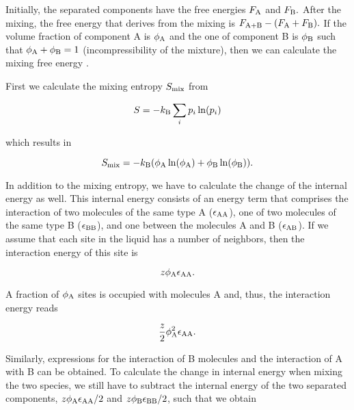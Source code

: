 \documentclass[letterpaper,10pt,english]{sphinxmanual}
\begin{document}
\sphinxAtStartPar
Initially, the separated components have the free energies \(F_{\rm A}\) and \(F_{\rm B}.\) After the mixing, the free energy that derives from the mixing is \(F_{\rm A+B}-(F_{\rm A}+F_{\rm B}).\) If the volume fraction of component A is \(\phi_{\rm A}\) and the one of component B is \(\phi_{\rm B}\) such that \(\phi_{\rm A}+\phi_{\rm B}=1\) (incompressibility of the mixture), then we can calculate the mixing free energy .

\sphinxAtStartPar
First we calculate the mixing entropy \(S_{\rm mix}\) from

\sphinxAtStartPar
\begin{equation}
S=-k_{\rm B}\sum_{i}p_{i}\ln(p_{i})
\end{equation}

\sphinxAtStartPar
which results in

\sphinxAtStartPar
\begin{equation}
S_{\rm mix}=-k_{\rm B}(\phi_{\rm A}\ln(\phi_{\rm A})+\phi_{\rm B}\ln(\phi_{\rm B})).
\end{equation}

\sphinxAtStartPar
In addition to the mixing entropy, we have to calculate the change of the internal energy as well. This internal energy consists of an energy term that comprises the interaction of two molecules of the same type A (\(\epsilon_{\rm AA}\)), one of two molecules of the same type B (\(\epsilon_{\rm BB}\)), and one between the molecules A and B (\(\epsilon_{\rm AB}\)). If we assume that each site in the liquid has a number of neighbors, then the interaction energy of this site is

\sphinxAtStartPar
\begin{equation}
z\phi_{\rm A}\epsilon_{\rm AA}.
\end{equation}

\sphinxAtStartPar
A fraction of \(\phi_{\rm A}\) sites is occupied with molecules A and, thus, the interaction energy reads

\sphinxAtStartPar
\begin{equation}
\frac{z}{2}\phi_{\rm A}^2\epsilon_{\rm AA}.
\end{equation}

\sphinxAtStartPar
Similarly, expressions for the interaction of B molecules and the interaction of A with B can be obtained. To calculate the change in internal energy when mixing the two species, we still have to subtract the internal energy of the two separated components, \(z\phi_{\rm A}\epsilon_{\rm AA}/2\) and \(z\phi_{\rm B}\epsilon_{\rm BB}/2\), such that we obtain
\end{document}
